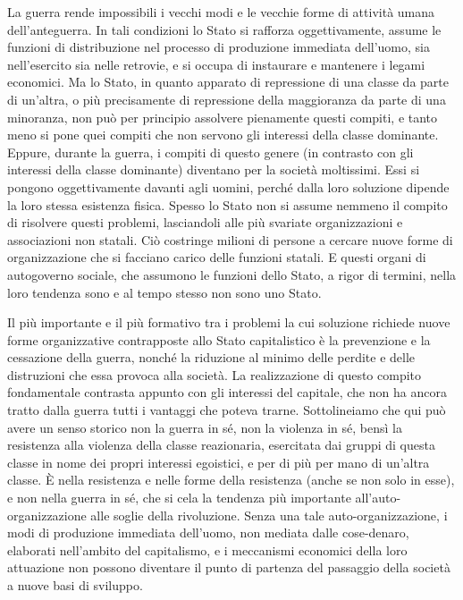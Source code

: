 \documentclass[12pt,a4paper,openany]{book}
\begin{document}
La guerra rende impossibili i vecchi modi e le vecchie forme di attività umana dell'anteguerra. In tali condizioni lo Stato si rafforza oggettivamente, assume le funzioni di distribuzione nel processo di produzione immediata dell'uomo, sia nell'esercito sia nelle retrovie, e si occupa di instaurare e mantenere i legami economici. Ma lo Stato, in quanto apparato di repressione di una classe da parte di un'altra, o più precisamente di repressione della maggioranza da parte di una minoranza, non può per principio assolvere pienamente questi compiti, e tanto meno si pone quei compiti che non servono gli interessi della classe dominante. Eppure, durante la guerra, i compiti di questo genere (in contrasto con gli interessi della classe dominante) diventano per la società moltissimi. Essi si pongono oggettivamente davanti agli uomini, perché dalla loro soluzione dipende la loro stessa esistenza fisica. Spesso lo Stato non si assume nemmeno il compito di risolvere questi problemi, lasciandoli alle più svariate organizzazioni e associazioni non statali. Ciò costringe milioni di persone a cercare nuove forme di organizzazione che si facciano carico delle funzioni statali. E questi organi di autogoverno sociale, che assumono le funzioni dello Stato, a rigor di termini, nella loro tendenza sono e al tempo stesso non sono uno Stato.

Il più importante e il più formativo tra i problemi la cui soluzione richiede nuove forme organizzative contrapposte allo Stato capitalistico è la prevenzione e la cessazione della guerra, nonché la riduzione al minimo delle perdite e delle distruzioni che essa provoca alla società. La realizzazione di questo compito fondamentale contrasta appunto con gli interessi del capitale, che non ha ancora tratto dalla guerra tutti i vantaggi che poteva trarne. Sottolineiamo che qui può avere un senso storico non la guerra in sé, non la violenza in sé, bensì la resistenza alla violenza della classe reazionaria, esercitata dai gruppi di questa classe in nome dei propri interessi egoistici, e per di più per mano di un'altra classe. È nella resistenza e nelle forme della resistenza (anche se non solo in esse), e non nella guerra in sé, che si cela la tendenza più importante all'auto-organizzazione alle soglie della rivoluzione. Senza una tale auto-organizzazione, i modi di produzione immediata dell'uomo, non mediata dalle cose-denaro, elaborati nell'ambito del capitalismo, e i meccanismi economici della loro attuazione non possono diventare il punto di partenza del passaggio della società a nuove basi di sviluppo.
\end{document}
